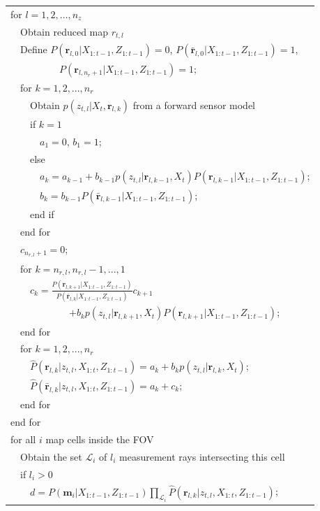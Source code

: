 \documentclass[letterpaper, 10pt, conference]{ieeeconf}
\begin{document}
\begin{table}
\begin{tabular}{ l }
  for $l = 1,2,...,n_z$\\
   \ \ Obtain reduced map $r_{t,l}$\\
   \ \ Define $P(\mathbf{r}_{l,0}|X_{1:t-1},Z_{1:t-1})=0$, $P(\bar{\mathbf{r}}_{l,0}|X_{1:t-1},Z_{1:t-1})=1$, \\  \ \ \ \ \ \ \ \ \ \   $P(\mathbf{r}_{l,n_r+1}|X_{1:t-1},Z_{1:t-1})=1$;\\
   \ \ for $k = 1,2,...,n_r$\\
   \ \ \ \ Obtain $p(z_{t,l}|X_t,\mathbf{r}_{l,k})$ from a forward sensor model\\
   \ \ \ \ if $k=1$\\
   \ \ \ \ \ \ $a_1=0$, $b_1=1$;\\
   \ \ \ \ else\\
   \ \ \ \ \ \ $a_k=a_{k-1}+b_{k-1}p(z_{t,l}|\mathbf{r}_{l,k-1},X_t)P(\mathbf{r}_{l,k-1}|X_{1:t-1},Z_{1:t-1})$;\\
   \ \ \ \ \ \ $b_k=b_{k-1}P(\bar{\mathbf{r}}_{l,k-1}|X_{1:t-1},Z_{1:t-1})$;\\
   \ \ \ \ end if\\
   \ \ end for\\
   \ \ $c_{n_{r,l}+1}=0$;\\
   \ \ for $k = n_{r,l},n_{r,l}-1,...,1$\\
   \ \ \ \ $c_k=\frac{P(\mathbf{r}_{l,k+1}|X_{1:t-1},Z_{1:t-1})}{P(\bar{\mathbf{r}}_{l,k}|X_{1:t-1},Z_{1:t-1})}c_{k+1}$\\
   \ \ \ \ \ \ \ \ \ \ \ \ $+b_{k}p(z_{t,l}|\mathbf{r}_{l,k+1},X_t)P(\mathbf{r}_{l,k+1}|X_{1:t-1},Z_{1:t-1})$;\\
   \ \ end for\\
   \ \ for $k = 1,2,...,n_r$\\
   \ \ \ \ $\hat P(\mathbf{r}_{l,k}|z_{t,l},X_{1:t},Z_{1:t-1})=a_k+b_kp(z_{t,l}|\mathbf{r}_{l,k},X_t)$;\\
   \ \ \ \ $\hat P(\bar{\mathbf{r}}_{l,k}|z_{t,l},X_{1:t},Z_{1:t-1})=a_k+c_k$;\\
   \ \ end for\\
   end for\\
   for all $i$ map cells inside the FOV\\
   \ \ Obtain the set $\mathcal L_i$ of $l_i$ measurement rays intersecting this cell\\
   \ \ if $l_i>0$\\
   \ \ \ \ $d=P(\mathbf{m}_i|X_{1:t-1},Z_{1:t-1})\prod_{\mathcal L_i}\hat P(\mathbf{r}_{l,k}|z_{t,l},X_{1:t},Z_{1:t-1})$;\\

\end{tabular}
\end{table}
\end{document}
